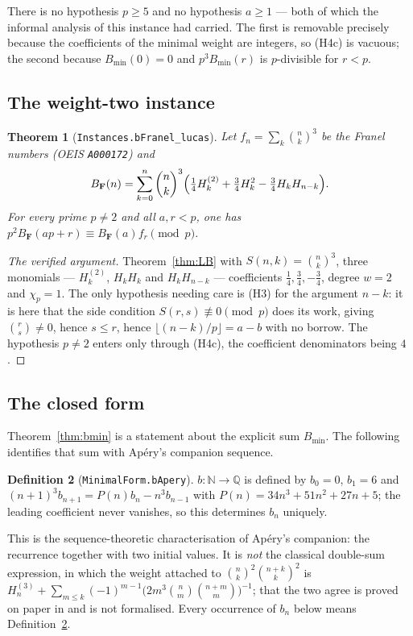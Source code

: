 \documentclass[11pt,reqno]{amsart}
\theoremstyle{plain}
\newtheorem{theorem}{Theorem}[section]
\theoremstyle{definition}
\newtheorem{definition}[theorem]{Definition}
\theoremstyle{remark}
\newcommand{\Q}{\mathbb{Q}}
\newcommand{\N}{\mathbb{N}}
\newcommand{\bin}[2]{\binom{#1}{#2}}
\newcommand{\HH}[2]{H^{(#1)}_{#2}}
\newcommand{\Ln}[1]{\texttt{#1}}
\numberwithin{equation}{section}
\begin{document}
There is no hypothesis $p\ge5$ and no hypothesis $a\ge1$ --- both of which the informal
analysis of this instance had carried. The first is removable precisely because the
coefficients of the minimal weight are integers, so (H4c) is vacuous; the second because
$B_{\min}(0)=0$ and $p^3B_{\min}(r)$ is $p$-divisible for $r<p$.

\subsection{The weight-two instance}

\begin{theorem}[\Ln{Instances.bFranel\_lucas}]\label{thm:franel}
Let $f_n=\sum_k\bin nk^3$ be the Franel numbers \textup{(OEIS \texttt{A000172})} and
\[
   B_{\mathbf F}(n)=\sum_{k=0}^{n}\bin nk^3
     \Bigl(\tfrac14\HH2k+\tfrac34H_k^2-\tfrac34H_kH_{n-k}\Bigr).
\]
For every prime $p\ne2$ and all $a,r<p$, one has
$p^2B_{\mathbf F}(ap+r)\equiv B_{\mathbf F}(a)f_r\pmod p$.
\end{theorem}

\begin{proof}[The verified argument]
Theorem~\ref{thm:LB} with $S(n,k)=\bin nk^3$, three monomials --- $\HH2k$, $H_kH_k$ and
$H_kH_{n-k}$ --- coefficients $\tfrac14,\tfrac34,-\tfrac34$, degree $w=2$ and $\chi_p=1$.
The only hypothesis needing care is (H3) for the argument $n-k$: it is here that the side
condition $S(r,s)\not\equiv0\pmod p$ does its work, giving $\bin rs\ne0$, hence $s\le r$,
hence $\lfloor(n-k)/p\rfloor=a-b$ with no borrow. The hypothesis $p\ne2$ enters only through
(H4c), the coefficient denominators being $4$.
\end{proof}

\subsection{The closed form}

Theorem~\ref{thm:bmin} is a statement about the explicit sum $B_{\min}$. The following
identifies that sum with Ap\'ery's companion sequence.

\begin{definition}[\Ln{MinimalForm.bApery}]\label{def:bapery}
$b:\N\to\Q$ is defined by $b_0=0$, $b_1=6$ and
$(n+1)^3b_{n+1}=P(n)b_n-n^3b_{n-1}$ with $P(n)=34n^3+51n^2+27n+5$; the leading coefficient
never vanishes, so this determines $b_n$ uniquely.
\end{definition}

This is the sequence-theoretic characterisation of Ap\'ery's companion: the recurrence
together with two initial values. It is \emph{not} the classical double-sum expression, in
which the weight attached to $\bin nk^2\bin{n+k}k^2$ is
$\HH3n+\sum_{m\le k}(-1)^{m-1}\bigl(2m^3\bin nm\bin{n+m}m\bigr)^{-1}$; that the two agree is
proved on paper in \cite{PaperLucas} and is not formalised. Every occurrence of $b_n$ below
means Definition~\ref{def:bapery}.
\end{document}
